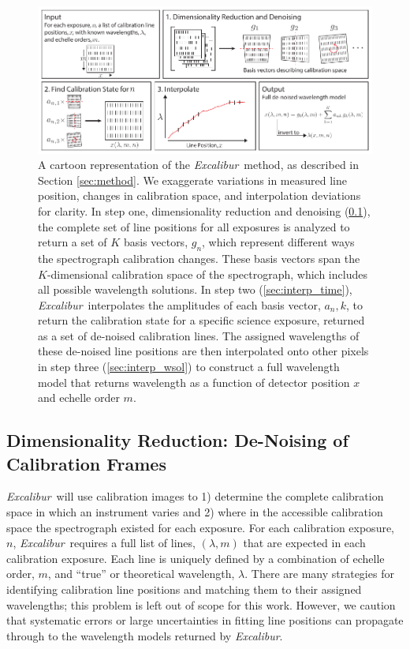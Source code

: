 \documentclass[modern]{aastex63}
\newcommand{\project}[1]{\textsl{#1}}
\newcommand{\name}{\project{Excalibur}}
\begin{document}
\begin{figure}[t]
\centering
\includegraphics[width=\textwidth]{Figures/methodCartoon.pdf}
\caption{A cartoon representation of the \name\ method, as described in Section \ref{sec:method}.  We exaggerate variations in measured line position, changes in calibration space, and interpolation deviations for clarity.  In step one, dimensionality reduction and denoising (\textsection \ref{sec:denoising}), the complete set of line positions for all exposures is analyzed to return a set of $K$ basis vectors, $g_n$, which represent different ways the spectrograph calibration changes.  These basis vectors span the $K$-dimensional calibration space of the spectrograph, which includes all possible wavelength solutions.  In step two (\textsection \ref{sec:interp_time}), \name\ interpolates the amplitudes of each basis vector, $a_n,k$, to return the calibration state for a specific science exposure, returned as a set of de-noised calibration lines.  The assigned wavelengths of these de-noised line positions are then interpolated onto other pixels in step three (\textsection \ref{sec:interp_wsol}) to construct a full wavelength model that returns wavelength as a function of detector position $x$ and echelle order $m$.}
\label{fig:cartoon}
\end{figure} 

\subsection{Dimensionality Reduction: De-Noising of Calibration Frames} \label{sec:denoising}
\name\ will use calibration images to  1) determine the complete calibration space in which an instrument varies and 2) where in the accessible calibration space the spectrograph existed for each exposure.  For each calibration exposure, $n$, \name\ requires a full list of lines, $(\lambda,m)$ that are expected in each calibration exposure.  Each line is uniquely defined by a combination of echelle order, $m$, and ``true'' or theoretical wavelength, $\lambda$.  There are many strategies for identifying calibration line positions and matching them to their assigned wavelengths; this problem is left out of scope for this work.  However, we caution that systematic errors or large uncertainties in fitting line positions can propagate through to the wavelength models returned by \name.
\end{document}
